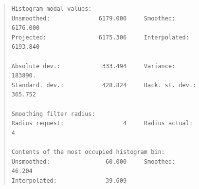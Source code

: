\documentclass[twoside,11pt]{article}
\newenvironment{myquote}{\begin{quote}\begin{small}}{\end{small}\end{quote}}
\begin{document}
\newpage
\begin{myquote}
\begin{verbatim}
Histogram modal values:
Unsmoothed:              6179.000     Smoothed:             6176.000
Projected:               6175.306     Interpolated:         6193.840

Absolute dev.:            333.494     Variance:              183890.
Standard. dev.:           428.824     Back. st. dev.:        365.752

Smoothing filter radius:
Radius request:                 4     Radius actual:               4

Contents of the most occupied histogram bin:
Unsmoothed:                60.000     Smoothed:               46.204
Interpolated:              39.609
\end{verbatim}
\end{myquote}
\end{document}

